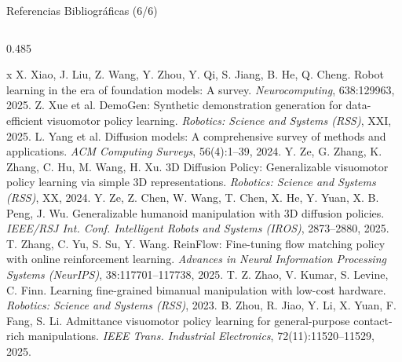 \documentclass[aspectratio=169,10pt,xcolor={dvipsnames,table}]{beamer}
\begin{document}
\begin{frame}{Referencias Bibliográficas (6/6)}
\begin{columns}[T, onlytextwidth]
\begin{column}{0.485\textwidth}
\begin{thebibliography}{x}
         X. Xiao, J. Liu, Z. Wang, Y. Zhou, Y. Qi, S. Jiang, B. He, Q. Cheng. \newblock Robot learning in the era of foundation models: A survey. \newblock \emph{Neurocomputing}, 638:129963, 2025.
         Z. Xue et al. \newblock DemoGen: Synthetic demonstration generation for data-efficient visuomotor policy learning. \newblock \emph{Robotics: Science and Systems (RSS)}, XXI, 2025.
         L. Yang et al. \newblock Diffusion models: A comprehensive survey of methods and applications. \newblock \emph{ACM Computing Surveys}, 56(4):1--39, 2024.
         Y. Ze, G. Zhang, K. Zhang, C. Hu, M. Wang, H. Xu. \newblock 3D Diffusion Policy: Generalizable visuomotor policy learning via simple 3D representations. \newblock \emph{Robotics: Science and Systems (RSS)}, XX, 2024.
         Y. Ze, Z. Chen, W. Wang, T. Chen, X. He, Y. Yuan, X. B. Peng, J. Wu. \newblock Generalizable humanoid manipulation with 3D diffusion policies. \newblock \emph{IEEE/RSJ Int. Conf. Intelligent Robots and Systems (IROS)}, 2873--2880, 2025.
         T. Zhang, C. Yu, S. Su, Y. Wang. \newblock ReinFlow: Fine-tuning flow matching policy with online reinforcement learning. \newblock \emph{Advances in Neural Information Processing Systems (NeurIPS)}, 38:117701--117738, 2025.
         T. Z. Zhao, V. Kumar, S. Levine, C. Finn. \newblock Learning fine-grained bimanual manipulation with low-cost hardware. \newblock \emph{Robotics: Science and Systems (RSS)}, 2023.
         B. Zhou, R. Jiao, Y. Li, X. Yuan, F. Fang, S. Li. \newblock Admittance visuomotor policy learning for general-purpose contact-rich manipulations. \newblock \emph{IEEE Trans. Industrial Electronics}, 72(11):11520--11529, 2025.
      \end{thebibliography}
    \end{column}
  \end{columns}
\end{frame}
\end{document}
